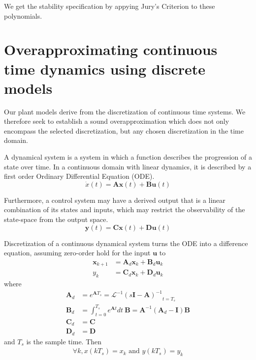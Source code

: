 \documentclass[sigconf]{llncs}
\newcommand{\mat}[1]{\boldsymbol{#1}}
\renewcommand{\vec}[1]{\boldsymbol{#1}}
\begin{document}
We get the stability specification by appying Jury's Criterion to these polynomials.

\section{Overapproximating continuous time dynamics using discrete models}
\label{sec:cont_aa}
Our plant models derive from the discretization of
continuous time systems.  We therefore seek to establish a sound
overapproximation which does not only encompass the selected discretization,
but any chosen discretization in the time domain.

A dynamical system is a system in which a function describes the progression
of a state over time.  In a continuous domain with linear dynamics, it is
described by a first order Ordinary Differential Equation (ODE).
\begin{equation}
\dot{x}(t)=\mat{A}\vec{x}(t)+\mat{B}\vec{u}(t)%
\label{eq:dynamical}
\end{equation}

Furthermore, a control system may have a derived
output that is a linear combination of its states and inputs, which may
restrict the observability of the state-space from the output space.
\begin{equation}
\vec{y}(t)=\mat{C}\vec{x}(t)+\mat{D}\vec{u}(t)
\end{equation}

Discretization of a continuous dynamical system turns the ODE into a
difference equation, assuming zero-order hold for the input $\vec{u}$
to
\begin{align}
\label{eq:discretization}
\vec{x}_{k+1} &= \mat{A}_d\vec{x}_k+\mat{B}_d\vec{u}_k\\%
y_k &= \mat{C}_d \vec{x}_ k + \mat{D}_d \vec{u}_ k 
\end{align}
where
\begin{align}
\label{eq:discretize}
\mat{A}_d &= e^{\mat{A} T_s} = \mathcal{L}^{-1} { ( s \mat{I} - \mat{A} )^{-1} }_{t = T_s}\\
\mat{B}_d &= \int_{t = 0}^{T_s} e^{\mat{A} t} dt\ \mat{B} = \mat{A}^{-1} ( \mat{A}_d - \mat{I} ) \mat{B}\\
\mat{C}_d &= \mat{C}\\
\mat{D}_d &= \mat{D}
\end{align}
and $T_s$ is the sample time. Then
\begin{align*}
\forall k, x(kT_s)=x_k \text{ and } y(kT_s) = y_k
\end{align*}
\end{document}
